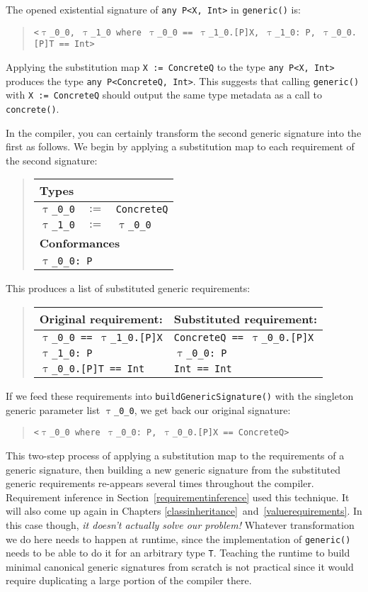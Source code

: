 \documentclass[a4paper,headsepline,bibliography=totoc,toc=flat,fleqn,twoside=semi]{scrbook}
\theoremstyle{definition}
\theoremstyle{definition}
\theoremstyle{definition}
\newcommand{\ttgp}[2]{\texttt{$\uptau$\_#1\_#2}}
\newcommand{\SubMapC}[2]{\begin{tabular}{|lll|}
\hline
\multicolumn{3}{|l|}{\textbf{Types}}\\
\hline
#1\\
\hline
\hline
\multicolumn{3}{|l|}{\textbf{Conformances}}\\
\hline
#2\\
\hline
\end{tabular}}
\newcommand{\SubType}[2]{\texttt{#1}&$:=$&\texttt{#2}}
\newcommand{\SubConf}[1]{\multicolumn{3}{|l|}{\texttt{#1}}}
\begin{document}
The opened existential signature of \texttt{any P<X, Int>} in \texttt{generic()} is:
\begin{quote}
\texttt{<\ttgp{0}{0}, \ttgp{1}{0} where \ttgp{0}{0} == \ttgp{1}{0}.[P]X, \ttgp{1}{0}:\ P, \ttgp{0}{0}.[P]T == Int>}
\end{quote}

Applying the substitution map \texttt{X := ConcreteQ} to the type \texttt{any~P<X,~Int>} produces the type \texttt{any~P<ConcreteQ,~Int>}. This suggests that calling \texttt{generic()} with \texttt{X~:=~ConcreteQ} should output the same type metadata as a call to \texttt{concrete()}.

In the compiler, you can certainly transform the second generic signature into the first as follows. We begin by applying a substitution map to each requirement of the second signature:
\begin{quote}
\SubMapC{
\SubType{\ttgp{0}{0}}{ConcreteQ}\\
\SubType{\ttgp{1}{0}}{\ttgp{0}{0}}
}{
\SubConf{\ttgp{0}{0}:\ P}
}
\end{quote}
This produces a list of substituted generic requirements:
\begin{quote}
\begin{tabular}{|l|l|}
\hline
Original requirement:&Substituted requirement:\\
\hline
\texttt{\ttgp{0}{0} == \ttgp{1}{0}.[P]X}&\texttt{ConcreteQ == \ttgp{0}{0}.[P]X}\\
\texttt{\ttgp{1}{0}:\ P}&\texttt{\ttgp{0}{0}:\ P}\\
\texttt{\ttgp{0}{0}.[P]T == Int}&\texttt{Int == Int}\\
\hline
\end{tabular}
\end{quote}
If we feed these requirements into \texttt{buildGenericSignature()} with the singleton generic parameter list \texttt{\ttgp{0}{0}}, we get back our original signature:
\begin{quote}
\texttt{<\ttgp{0}{0} where \ttgp{0}{0}:\ P, \ttgp{0}{0}.[P]X == ConcreteQ>}
\end{quote}
This two-step process of applying a substitution map to the requirements of a generic signature, then building a new generic signature from the substituted generic requirements re-appears several times throughout the compiler. Requirement inference in Section~\ref{requirementinference} used this technique. It will also come up again in Chapters \ref{classinheritance}~and~\ref{valuerequirements}. In this case though, \textsl{it doesn't actually solve our problem!} Whatever transformation we do here needs to happen at runtime, since the implementation of \texttt{generic()} needs to be able to do it for an arbitrary type \texttt{T}. Teaching the runtime to build minimal canonical generic signatures from scratch is not practical since it would require duplicating a large portion of the compiler there.
\end{document}
